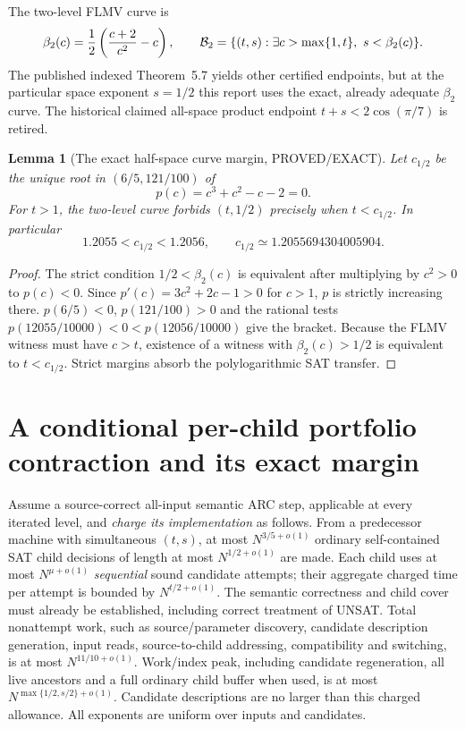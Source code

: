 \documentclass[11pt]{article}
\newtheorem{lemma}[theorem]{Lemma}
\begin{document}
The two-level FLMV curve is
\[
\beta_2(c)=\frac12\left(\frac{c+2}{c^2}-c\right),
\qquad {\cal B}_2=\{(t,s):\exists c>\max\{1,t\},\ s<\beta_2(c)\}.
\]
The published indexed Theorem~5.7 yields other certified endpoints, but at the particular space exponent $s=1/2$ this report uses the exact, already adequate $\beta_2$ curve. The historical claimed all-space product endpoint $t+s<2\cos(\pi/7)$ is retired.

\begin{lemma}[The exact half-space curve margin, PROVED/EXACT]
Let $c_{1/2}$ be the unique root in $(6/5,121/100)$ of
\[
p(c)=c^3+c^2-c-2=0.
\]
For $t>1$, the two-level curve forbids $(t,1/2)$ precisely when $t<c_{1/2}$. In particular
\[
1.2055<c_{1/2}<1.2056,\qquad
c_{1/2}\simeq1.2055694304005904.
\]
\end{lemma}
\begin{proof}
The strict condition $1/2<\beta_2(c)$ is equivalent after multiplying by $c^2>0$ to $p(c)<0$. Since $p'(c)=3c^2+2c-1>0$ for $c>1$, $p$ is strictly increasing there. $p(6/5)<0$, $p(121/100)>0$ and the rational tests $p(12055/10000)<0<p(12056/10000)$ give the bracket. Because the FLMV witness must have $c>t$, existence of a witness with $\beta_2(c)>1/2$ is equivalent to $t<c_{1/2}$. Strict margins absorb the polylogarithmic SAT transfer.
\end{proof}

\section{A conditional per-child portfolio contraction and its exact margin}
Assume a source-correct all-input semantic ARC step, applicable at every iterated level, and \emph{charge its implementation} as follows. From a predecessor machine with simultaneous $(t,s)$, at most $N^{3/5+o(1)}$ ordinary self-contained SAT child decisions of length at most $N^{1/2+o(1)}$ are made. Each child uses at most $N^{\mu+o(1)}$ \emph{sequential} sound candidate attempts; their aggregate charged time per attempt is bounded by $N^{t/2+o(1)}$. The semantic correctness and child cover must already be established, including correct treatment of UNSAT. Total nonattempt work, such as source/parameter discovery, candidate description generation, input reads, source-to-child addressing, compatibility and switching, is at most $N^{11/10+o(1)}$. Work/index peak, including candidate regeneration, all live ancestors and a full ordinary child buffer when used, is at most $N^{\max\{1/2,s/2\}+o(1)}$. Candidate descriptions are no larger than this charged allowance. All exponents are uniform over inputs and candidates.
\end{document}
